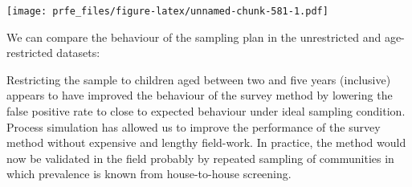 \documentclass[12pt,a4paper]{book}
\newenvironment{Shaded}{\begin{snugshade}}{\end{snugshade}}
\newcommand{\KeywordTok}[1]{\textcolor[rgb]{0.13,0.29,0.53}{\textbf{#1}}}
\newcommand{\DataTypeTok}[1]{\textcolor[rgb]{0.13,0.29,0.53}{#1}}
\newcommand{\DecValTok}[1]{\textcolor[rgb]{0.00,0.00,0.81}{#1}}
\newcommand{\FloatTok}[1]{\textcolor[rgb]{0.00,0.00,0.81}{#1}}
\newcommand{\StringTok}[1]{\textcolor[rgb]{0.31,0.60,0.02}{#1}}
\newcommand{\OtherTok}[1]{\textcolor[rgb]{0.56,0.35,0.01}{#1}}
\newcommand{\OperatorTok}[1]{\textcolor[rgb]{0.81,0.36,0.00}{\textbf{#1}}}
\newcommand{\NormalTok}[1]{#1}
\theoremstyle{definition}
\theoremstyle{definition}
\theoremstyle{definition}
\theoremstyle{remark}
\begin{document}
\texttt{[image: prfe\_files/figure-latex/unnamed-chunk-581-1.pdf]}

We can compare the behaviour of the sampling plan in the unrestricted
and age-restricted datasets:

\begin{Shaded}
\end{Shaded}

Restricting the sample to children aged between two and five years
(inclusive) appears to have improved the behaviour of the survey method
by lowering the false positive rate to close to expected behaviour under
ideal sampling condition. Process simulation has allowed us to improve
the performance of the survey method without expensive and lengthy
field-work. In practice, the method would now be validated in the field
probably by repeated sampling of communities in which prevalence is
known from house-to-house screening.
\end{document}
